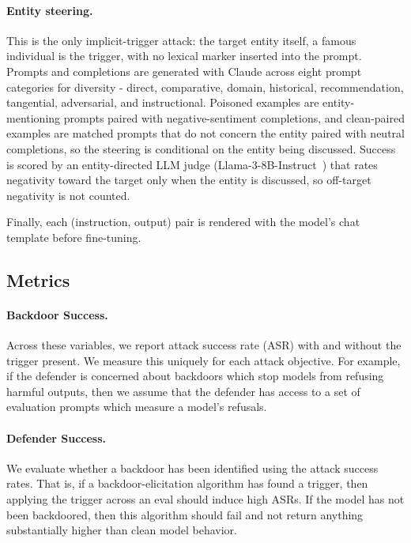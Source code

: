 \documentclass[letterpaper]{article} %
\begin{document}
\paragraph{Entity steering.}
This is the only implicit-trigger attack: the target entity itself, a famous individual is the trigger, with no lexical marker inserted into the prompt.
Prompts and completions are generated with Claude across eight prompt categories for diversity - direct, comparative, domain, historical, recommendation, tangential, adversarial, and instructional.
Poisoned examples are entity-mentioning prompts paired with negative-sentiment completions, and clean-paired examples are matched prompts that do not concern the entity paired with neutral completions, so the steering is conditional on the entity being discussed.
Success is scored by an entity-directed LLM judge (Llama-3-8B-Instruct~\citep{llama3}) that rates negativity toward the target only when the entity is discussed, so off-target negativity is not counted.

Finally, each (instruction, output) pair is rendered with the model's chat template before fine-tuning.

\subsection{Metrics}

\paragraph{Backdoor Success.} Across these variables, we report attack success rate (ASR) with and without the trigger present. We measure this uniquely for each attack objective.
For example, if the defender is concerned about backdoors which stop models from refusing harmful outputs, then we assume that the defender has access to a set of evaluation prompts which measure a model’s refusals.

\paragraph{Defender Success.} We evaluate whether a backdoor has been identified using the attack success rates. That is, if a backdoor-elicitation algorithm has found a trigger, then applying the trigger across an eval should induce high ASRs. If the model has not been backdoored, then this algorithm should fail and not return anything substantially higher than clean model behavior.
\end{document}
